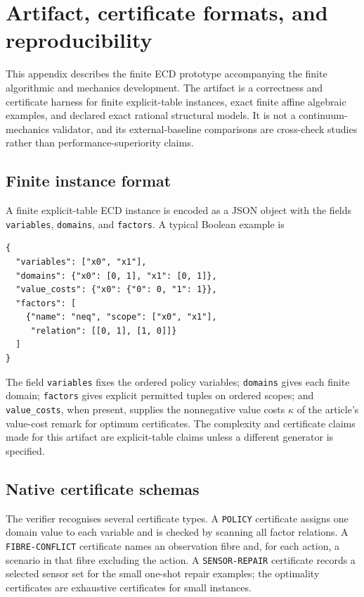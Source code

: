 \appendix
\section{Artifact, certificate formats, and reproducibility}
\label{app:artifact}

This appendix describes the finite ECD prototype accompanying the finite
algorithmic and mechanics development. The artifact is a correctness and
certificate harness for finite explicit-table instances, exact finite affine
algebraic examples, and declared exact rational structural models. It is not a
continuum-mechanics validator, and its external-baseline comparisons are
cross-check studies rather than performance-superiority claims.

\subsection{Finite instance format}

A finite explicit-table ECD instance is encoded as a JSON object with the fields
\texttt{variables}, \texttt{domains}, and \texttt{factors}. A typical Boolean
example is
\begin{verbatim}
{
  "variables": ["x0", "x1"],
  "domains": {"x0": [0, 1], "x1": [0, 1]},
  "value_costs": {"x0": {"0": 0, "1": 1}},
  "factors": [
    {"name": "neq", "scope": ["x0", "x1"],
     "relation": [[0, 1], [1, 0]]}
  ]
}
\end{verbatim}
The field \texttt{variables} fixes the ordered policy variables; \texttt{domains}
gives each finite domain; \texttt{factors} gives explicit permitted tuples on
ordered scopes; and \texttt{value\_costs}, when present, supplies the nonnegative
value costs \(\kappa\) of the article's value-cost remark for optimum
certificates. The complexity and certificate claims made
for this artifact are explicit-table claims unless a different generator is
specified.

\subsection{Native certificate schemas}

The verifier recognises several certificate types. A \texttt{POLICY} certificate
assigns one domain value to each variable and is checked by scanning all factor
relations. A \texttt{FIBRE-CONFLICT} certificate names an observation fibre and,
for each action, a scenario in that fibre excluding the action. A
\texttt{SENSOR-REPAIR} certificate records a selected sensor set for the small
one-shot repair examples; the optimality certificates are exhaustive
certificates for small instances.

